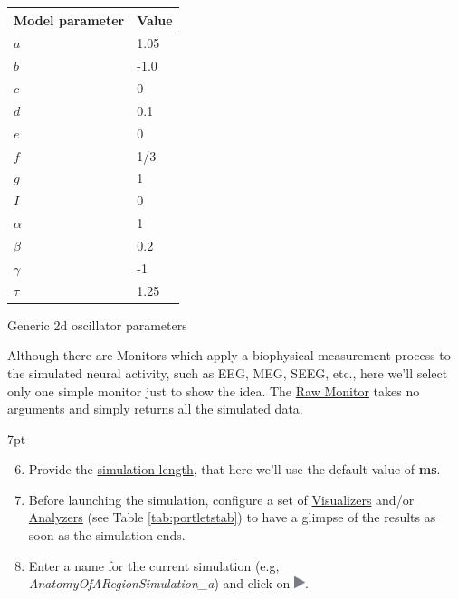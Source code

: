 \documentclass{tufte-handout}
\newenvironment{simulation}{%
  \def\FrameCommand{%
    \hspace{1pt}%
    {\color{ForestGreen}\vrule width 2pt}%
    {\color{simulationshade}\vrule width 4pt}%
    \colorbox{simulationshade}%
  }%
  \MakeFramed{\advance\hsize-\width\FrameRestore}%
  \noindent\hspace{-4.55pt}%
  \begin{adjustwidth}{}{7pt}%
  \vspace{2pt}\vspace{2pt}%
}
{%
  \vspace{2pt}\end{adjustwidth}\endMakeFramed%
}
\begin{document}
\begin{margintable}
  \centering
  \selectfont
  \begin{tabular}{ll}
    \toprule
    Model parameter & Value \\
    \midrule
             $a$          &   1.05   \\
             $b$          &  -1.0    \\
             $c$           &   0        \\
             $d$           &   0.1    \\
             $e$           &   0        \\
             $f$            &   1/3    \\
             $g$           &   1        \\
             $I$            &   0        \\
             $\alpha$   &   1        \\
             $\beta$     &   0.2     \\
             $\gamma$&  -1       \\
             $\tau$       &   1.25   \\
    \bottomrule
  \end{tabular}
  \caption{Generic 2d oscillator parameters}
  \label{tab:modeltab}
\end{margintable}




Although there are Monitors which apply a biophysical measurement process to
the simulated neural activity, such as EEG, MEG, SEEG, etc.,  here we'll select only
one simple monitor just to show the idea. The \underline{Raw Monitor} takes no arguments
and simply returns all the simulated data. 


\begin{simulation}
\begin{enumerate}[resume]
  \setcounter{enumi}{5}
 \item Provide the \underline{simulation length}, that here we'll use the default value of \textbf{\unit[1000]{ms}}.
 \item Before launching the simulation, configure a set of \underline{Visualizers} and/or \underline{Analyzers} (see Table \ref{tab:portletstab}) to have a glimpse of the results as soon as the simulation ends. 
 \item Enter a name for the current simulation (e.g, \textit{AnatomyOfARegionSimulation\_a}) and click on  \includegraphics[width=0.025\textwidth]{butt_launch_project.png}.
\end{enumerate}
\end{simulation}
\end{document}
